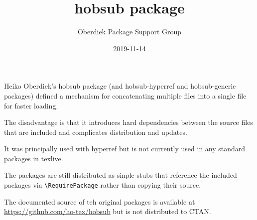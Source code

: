 \documentclass{article}
\title{hobsub package}
\author{Oberdiek Package Support Group}
\date{2019-11-14}
\begin{document}
\maketitle

Heiko Oberdiek's \textsf{hobsub} package (and \textsf{hobsub-hyperref}
and \textsf{hobsub-generic} packages) defined a mechanism for
concatenating multiple files into a single file for faster loading.

The disadvantage is that it introduces hard dependencies between the
source files that are included and complicates distribution and
updates.

It was principally used with \textsf{hyperref} but is not currently
used in any standard packages in texlive.

The packages are still distributed as sinple stubs that reference the
included packages via \verb|\RequirePackage|  rather than copying
their source.

The documented source of teh original packages is available at 
\url{https://github.com/ho-tex/hobsub}
but is not distributed to CTAN.
\end{document}
